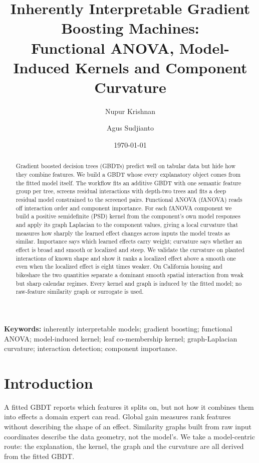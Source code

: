 \documentclass[11pt]{article}
\title{Inherently Interpretable Gradient Boosting Machines:\\
Functional ANOVA, Model-Induced Kernels and Component Curvature}
\author{Nupur Krishnan \and Agus Sudjianto}
\date{\today}
\begin{document}
\maketitle

\begin{abstract}
Gradient boosted decision trees (GBDTs) predict well on tabular data but hide
how they combine features. We build a GBDT whose every explanatory object comes
from the fitted model itself. The workflow fits an additive GBDT with one
semantic feature group per tree, screens residual interactions with depth-two
trees and fits a deep residual model constrained to the screened pairs.
Functional ANOVA (fANOVA) reads off interaction order and component importance.
For each fANOVA component we build a positive semidefinite (PSD) kernel from the
component's own model responses and apply its graph Laplacian to the component
values, giving a local curvature that measures how sharply the learned effect
changes across inputs the model treats as similar. Importance says which learned
effects carry weight; curvature says whether an effect is broad and smooth or
localized and steep. We validate the curvature on planted interactions of known
shape and show it ranks a localized effect above a smooth one even when the
localized effect is eight times weaker. On California housing and bikeshare the
two quantities separate a dominant smooth spatial interaction from weak but
sharp calendar regimes. Every kernel and graph is induced by the fitted model;
no raw-feature similarity graph or surrogate is used.
\end{abstract}

\medskip
\noindent\textbf{Keywords:} inherently interpretable models; gradient boosting;
functional ANOVA; model-induced kernel; leaf co-membership kernel; graph-Laplacian
curvature; interaction detection; component importance.

\section{Introduction}

A fitted GBDT reports which features it splits on, but not how it combines them
into effects a domain expert can read. Global gain measures rank features
without describing the shape of an effect. Similarity graphs built from raw
input coordinates describe the data geometry, not the model's. We take a
model-centric route: the explanation, the kernel, the graph and the curvature
are all derived from the fitted GBDT.
\end{document}
